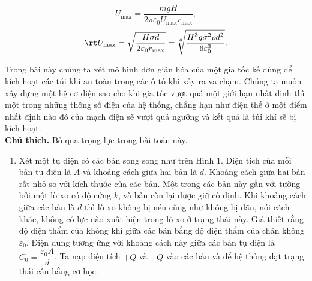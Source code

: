\begin{loigiai}
\begin{enumerate}[\bf Phần A.]
\begin{enumerate}[1)]
        \[U_{\max} = \dfrac{mgH}{2\pi \varepsilon_0 U_{\max} r_{\max}},\]
        \[\rt U_{\max} = \sqrt{\dfrac{H\sigma d}{2\varepsilon_0 r_{\max}}} = \sqrt[6]{\dfrac{H^3 g \sigma^2 \rho d^2}{6\varepsilon_0^3}}.\]
    \end{enumerate}
\end{enumerate}
\end{loigiai}


\begin{vd} %
Trong bài này chúng ta xét mô hình đơn giản hóa của một gia tốc kế dùng để kích hoạt các túi khí an toàn trong các ô tô khi xảy ra va chạm. Chúng ta muốn xây dựng một hệ cơ điện sao cho khi gia tốc vượt quá một giới hạn nhất định thì một trong những thông số điện của hệ thống, chẳng hạn như điện thế ở một điểm nhất định nào đó của mạch điện sẽ vượt quá ngưỡng và kết quả là túi khí sẽ bị kích hoạt.\\
\textbf{Chú thích.} Bỏ qua trọng lực trong bài toán này.
\begin{enumerate}[1)]
    \item Xét một tụ điện có các bản song song như trên Hình $1$. Diện tích của mỗi bản tụ điện là $A$ và khoảng cách giữa hai bản là $d$. Khoảng cách giữa hai bản rất nhỏ so với kích thước của các bản. Một trong các bản này gắn với tường bởi một lò xo có độ cứng $k$, và bản còn lại được giữ cố định. Khi khoảng cách giữa các bản là $d$ thì lò xo không bị nén cũng như không bị dãn, nói cách khác, không có lực nào xuất hiện trong lò xo ở trạng thái này. Giả thiết rằng độ điện thẩm của không khí giữa các bản bằng độ điện thẩm của chân không $\varepsilon_{0}$. Điện dung tương ứng với khoảng cách này giữa các bản tụ điện là $C_{0} = \dfrac{\varepsilon_{0} A }{d}$. Ta nạp điện tích $+Q$ và $-Q$ vào các bản và để hệ thống đạt trạng thái cân bằng cơ học.
    \begin{center}
    


\begin{tikzpicture}[x=0.75pt,y=0.75pt,yscale=-1,xscale=1]


\end{tikzpicture}
\end{center}
\end{enumerate}
\end{vd}
